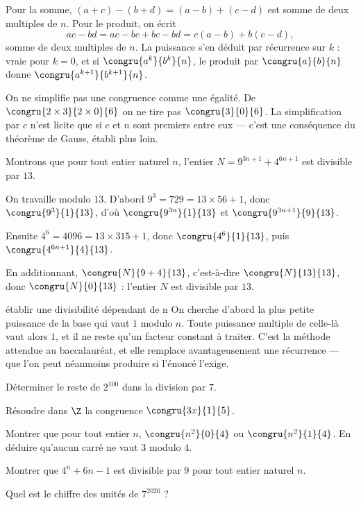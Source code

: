 \begin{demonstration}
Pour la somme, $(a+c)-(b+d) = (a-b)+(c-d)$ est somme de deux multiples de
$n$. Pour le produit, on écrit
\[
  ac-bd = ac-bc+bc-bd = c(a-b)+b(c-d),
\]
somme de deux multiples de $n$. La puissance s'en déduit par récurrence sur
$k$ : vraie pour $k = 0$, et si $\congru{a^{k}}{b^{k}}{n}$, le produit par
$\congru{a}{b}{n}$ donne $\congru{a^{k+1}}{b^{k+1}}{n}$.
\end{demonstration}

\begin{avertissement}
On ne simplifie pas une congruence comme une égalité. De
$\congru{2\times3}{2\times0}{6}$ on ne tire pas $\congru{3}{0}{6}$. La
simplification par $c$ n'est licite que si $c$ et $n$ sont premiers entre eux
— c'est une conséquence du théorème de Gauss, établi plus loin.
\end{avertissement}

\begin{exemple}
Montrons que pour tout entier naturel $n$, l'entier
$N = 9^{3n+1}+4^{6n+1}$ est divisible par $13$.

On travaille modulo $13$. D'abord
$9^{3} = 729 = 13\times56+1$, donc $\congru{9^{3}}{1}{13}$, d'où
$\congru{9^{3n}}{1}{13}$ et $\congru{9^{3n+1}}{9}{13}$.

Ensuite $4^{6} = 4096 = 13\times315+1$, donc $\congru{4^{6}}{1}{13}$, puis
$\congru{4^{6n+1}}{4}{13}$.

En additionnant, $\congru{N}{9+4}{13}$, c'est-à-dire
$\congru{N}{13}{13}$, donc $\congru{N}{0}{13}$ : l'entier $N$ est divisible
par $13$.
\end{exemple}

\begin{methode}{établir une divisibilité dépendant de n}
On cherche d'abord la plus petite puissance de la base qui vaut $1$ modulo
$n$. Toute puissance multiple de celle-là vaut alors $1$, et il ne reste qu'un
facteur constant à traiter. C'est la méthode attendue au baccalauréat, et elle
remplace avantageusement une récurrence — que l'on peut néanmoins produire si
l'énoncé l'exige.
\end{methode}

\begin{entrainement}[congruences]
\exo[\niveau{1}] Déterminer le reste de $2^{100}$ dans la division par $7$.

\exo[\niveau{1}] Résoudre dans $\Z$ la congruence $\congru{3x}{1}{5}$.

\exo[\niveau{2}] Montrer que pour tout entier $n$, $\congru{n^{2}}{0}{4}$ ou
$\congru{n^{2}}{1}{4}$. En déduire qu'aucun carré ne vaut $3$ modulo $4$.

\exo[\niveau{2}] Montrer que $4^{n}+6n-1$ est divisible par $9$ pour tout
entier naturel $n$.

\exo[\niveau{3}] Quel est le chiffre des unités de $7^{2026}$ ?
\end{entrainement}

